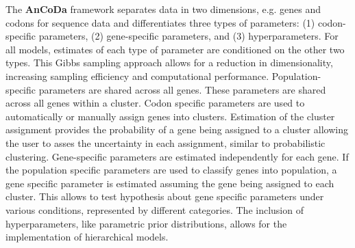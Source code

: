 \documentclass{bioinfo}
\newcommand{\package}{\textbf{AnCoDa }} %
\begin{document}
The \package framework separates data in two dimensions, e.g. genes and codons for sequence data and differentiates three types of parameters: (1) codon-specific parameters, (2) gene-specific parameters, and (3) hyperparameters. 
For all models, estimates of each type of parameter are conditioned on the other two types. 
This Gibbs sampling approach allows for a reduction in dimensionality, increasing sampling efficiency and computational performance.
Population-specific parameters are shared across all genes. These parameters are shared across all genes within a cluster. Codon specific parameters are used to automatically or manually assign genes into clusters.
Estimation of the cluster assignment provides the probability of a gene being assigned to a cluster allowing the user to asses the uncertainty in each assignment, similar to probabilistic clustering.
Gene-specific parameters are estimated independently for each gene. If the population specific parameters are used to classify genes into population, a gene specific parameter is estimated assuming the gene being assigned to each cluster. This allows to test hypothesis about gene specific parameters under various conditions, represented by different categories.
The inclusion of hyperparameters, like parametric prior distributions, allows for the implementation of hierarchical models.
\end{document}
